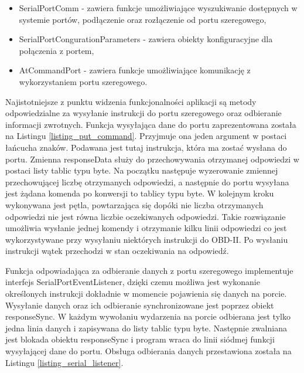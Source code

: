 \documentclass[12pt]{article} %
\numberwithin{equation}{subsection}
\numberwithin{figure}{section}
\numberwithin{table}{section}
\begin{document}
	\begin{itemize}
		\item{SerialPortComm - zawiera funkcje umożliwiające wyszukiwanie dostępnych w systemie portów, podłączenie oraz rozłączenie od portu szeregowego,}
		\item{SerialPortCongurationParameters - zawiera obiekty konfiguracyjne dla połączenia z portem,}
		\item{AtCommandPort - zawiera funkcje umożliwiające komunikację z wykorzystaniem portu szeregowego.}
	\end{itemize}
	
	Najistotniejsze z punktu widzenia funkcjonalności aplikacji są metody odpowiedzialne za wysyłanie instrukcji do portu szeregowego oraz odbieranie informacji zwrotnych. Funkcja wysyłająca dane do portu zaprezentowana została na Listingu \ref{listing_put_command}. Przyjmuje ona jeden argument w postaci łańcucha znaków. Podawana jest tutaj instrukcja, która ma zostać wysłana do portu. Zmienna responseData służy do przechowywania otrzymanej odpowiedzi w postaci listy tablic typu byte. Na początku następuje wyzerowanie zmiennej przechowującej liczbę otrzymanych odpowiedzi, a następnie do portu wysyłana jest żądana komenda po konwersji to tablicy typu byte. W kolejnym kroku wykonywana jest pętla, powtarzająca się dopóki nie liczba otrzymanych odpowiedzi nie jest równa liczbie oczekiwanych odpowiedzi. Takie rozwiązanie umożliwia wysłanie jednej komendy i otrzymanie kilku linii odpowiedzi co jest wykorzystywane przy wysyłaniu niektórych instrukcji do OBD-II. Po wysłaniu instrukcji wątek przechodzi w stan oczekiwania na odpowiedź.
	
	\newpage
	
	
	
	Funkcja odpowiadająca za odbieranie danych z portu szeregowego implementuje interfejs SerialPortEventListener, dzięki czemu możliwa jest wykonanie określonych instrukcji dokładnie w momencie pojawienia się danych na porcie. Wysyłanie danych oraz ich odbieranie synchronizowane jest poprzez obiekt responseSync. W każdym wywołaniu wydarzenia na porcie odbierana jest tylko jedna linia danych i zapisywana do listy tablic typu byte. Następnie zwalniana jest blokada obiektu responseSync i program wraca do linii siódmej funkcji wysyłającej dane do portu. Obsługa odbierania danych przestawiona została na Listingu \ref{listing_serial_listener}. \\
	
\end{document}
